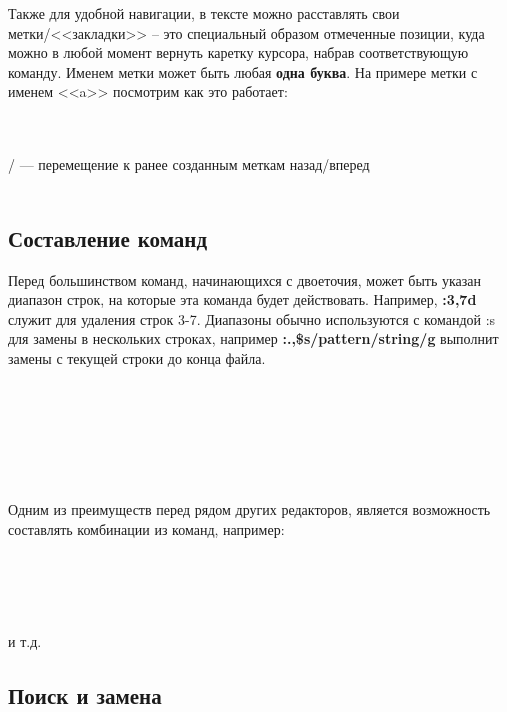 Также для удобной навигации, в тексте можно расставлять свои метки/<<закладки>> -- это специальный образом отмеченные позиции, куда можно в любой момент вернуть каретку курсора, набрав соответствующую команду. Именем метки может быть любая \textbf{одна буква}. На примере метки с именем <<a>> посмотрим как это работает:

\noindent
{}\\
\\
/ — перемещение к ранее созданным меткам назад/вперед\\
\\

\subsection*{Составление команд}
Перед большинством команд, начинающихся с двоеточия, может быть указан диапазон строк, на которые эта команда будет действовать. Например, \textbf{:3,7d} служит для удаления строк 3-7. Диапазоны обычно используются с командой :s для замены в нескольких строках, например \textbf{:.,\$s/pattern/string/g} выполнит замены с текущей строки до конца файла.

\noindent
{}\\
\\
\\
\\
\\
\\


Одним из преимуществ  перед рядом других редакторов, является возможность составлять комбинации из команд, например:

\noindent
{}\\
\\
\\
\\
и т.д.

\subsection*{Поиск и замена}

